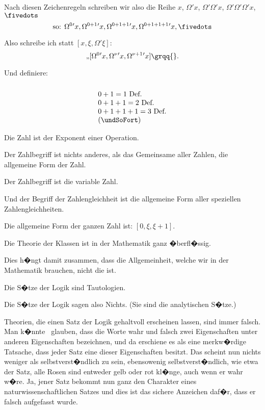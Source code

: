 \begin{propositions}
{Nach diesen Zeichenregeln schreiben wir also
die Reihe $x$, $\Omega'x$, $\Omega'\Omega'x$, $\Omega'\Omega'\Omega'x$, $\fivedots$
\[
\text{so: }\Omega^{0}{}'x, \Omega^{0+1}{}'x, \Omega^{0+1+1}{}'x, \Omega^{0+1+1+1}{}'x, \fivedots
\]

Also schreibe ich statt \glqq{}$[x, \xi, \Omega'\xi]$\grqq{}:
\[
\text{\quotedblbase} [\Omega^{0}{}'x, \Omega^{\nu}{}'x, \Omega^{\nu+1}{}'x]\text{\grqq{}.}
\]

Und definiere:
\[
\begin{array}{l}\\
0 + 1 = 1\text{ Def.}\\
0 + 1 + 1 = 2\text{ Def.}\\
0 + 1 + 1 + 1 = 3\text{ Def.}\\
\text{(\undSoFort)}
\end{array}
\]
}


{Die Zahl ist der Exponent einer Operation.}


{Der Zahlbegriff ist nichts anderes, als das
Gemeinsame aller Zahlen, die allgemeine Form
der Zahl.

Der Zahlbegriff ist die variable Zahl.

Und der Begriff der Zahlengleichheit ist die
allgemeine Form aller speziellen Zahlengleichheiten.}


{Die allgemeine Form der ganzen Zahl ist:
$[0, \xi, \xi + 1]$.}


{Die Theorie der Klassen ist in der Mathematik
ganz �berfl�ssig.

Dies h�ngt damit zusammen, dass die Allgemeinheit,
welche wir in der Mathematik brauchen,
nicht die  ist.}


{Die S�tze der Logik sind Tautologien.}


{Die S�tze der Logik sagen also Nichts. (Sie
sind die analytischen S�tze.)}


{Theorien, die einen Satz der Logik gehaltvoll
erscheinen lassen, sind immer falsch. Man k�nnte
\zumBeispiel\ glauben, dass die Worte \glqq{}wahr\grqq{} und \glqq{}falsch\grqq{}
zwei Eigenschaften unter anderen Eigenschaften
bezeichnen, und da erschiene es als eine merkw�rdige
Tatsache, dass jeder Satz eine dieser
Eigenschaften besitzt. Das scheint nun nichts
weniger als selbstverst�ndlich zu sein, ebensowenig
selbstverst�ndlich, wie etwa der Satz, \glqq{}alle Rosen
sind entweder gelb oder rot\grqq{} kl�nge, auch wenn er
wahr w�re. Ja, jener Satz bekommt nun ganz
den Charakter eines naturwissenschaftlichen Satzes
und dies ist das sichere Anzeichen daf�r, dass er
falsch aufgefasst wurde.}



\end{propositions}
